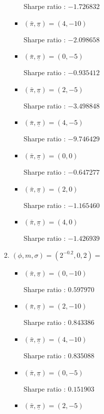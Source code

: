 \documentclass[12pt]{article}
\begin{document}
\begin{enumerate}
\begin{enumerate}
\begin{itemize}
Sharpe ratio : $-1.726832$

\item $(\bar{\pi}, \underline{\pi}) = (4,-10)$

Sharpe ratio : $-2.098658$

\item $(\bar{\pi}, \underline{\pi}) = (0,-5)$

Sharpe ratio : $-0.935412$

\item $(\bar{\pi}, \underline{\pi}) = (2,-5)$

Sharpe ratio : $-3.498848$

\item $(\bar{\pi}, \underline{\pi}) = (4,-5)$

Sharpe ratio : $-9.746429$

\item $(\bar{\pi}, \underline{\pi}) = (0,0)$

Sharpe ratio : $-0.647277$

\item $(\bar{\pi}, \underline{\pi}) = (2,0)$

Sharpe ratio : $-1.165460$

\item $(\bar{\pi}, \underline{\pi}) = (4,0)$

Sharpe ratio : $-1.426939$

\end{itemize}

\item$(\phi, m, \sigma) = (2^{-0.2},0,2) = $

\begin{itemize}

\item $(\bar{\pi}, \underline{\pi}) = (0,-10)$

Sharpe ratio : $0.597970$

\item $(\bar{\pi}, \underline{\pi}) = (2,-10)$

Sharpe ratio : $0.843386$

\item $(\bar{\pi}, \underline{\pi}) = (4,-10)$

Sharpe ratio : $0.835088$

\item $(\bar{\pi}, \underline{\pi}) = (0,-5)$

Sharpe ratio : $0.151903$

\item $(\bar{\pi}, \underline{\pi}) = (2,-5)$


\end{itemize}
\end{enumerate}
\end{enumerate}
\end{document}
